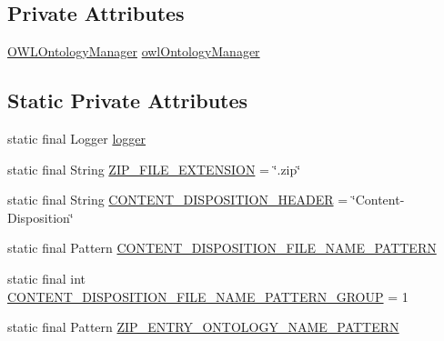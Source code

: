 \subsection*{Private Attributes}
\begin{DoxyCompactItemize}
\item 
\hyperlink{interfaceorg_1_1semanticweb_1_1owlapi_1_1model_1_1_o_w_l_ontology_manager}{O\-W\-L\-Ontology\-Manager} \hyperlink{classorg_1_1semanticweb_1_1owlapi_1_1io_1_1_abstract_o_w_l_parser_a6c362e88fff9fb36e661995812843370}{owl\-Ontology\-Manager}
\end{DoxyCompactItemize}
\subsection*{Static Private Attributes}
\begin{DoxyCompactItemize}
\item 
static final Logger \hyperlink{classorg_1_1semanticweb_1_1owlapi_1_1io_1_1_abstract_o_w_l_parser_a9385871827b98e599cec7cfc47d09955}{logger}
\item 
static final String \hyperlink{classorg_1_1semanticweb_1_1owlapi_1_1io_1_1_abstract_o_w_l_parser_a1ed6440b4d27465dd59b671e3d9f7f76}{Z\-I\-P\-\_\-\-F\-I\-L\-E\-\_\-\-E\-X\-T\-E\-N\-S\-I\-O\-N} = \char`\"{}.zip\char`\"{}
\item 
static final String \hyperlink{classorg_1_1semanticweb_1_1owlapi_1_1io_1_1_abstract_o_w_l_parser_a23d7055318a54ec7c25cf683e9457eb1}{C\-O\-N\-T\-E\-N\-T\-\_\-\-D\-I\-S\-P\-O\-S\-I\-T\-I\-O\-N\-\_\-\-H\-E\-A\-D\-E\-R} = \char`\"{}Content-\/Disposition\char`\"{}
\item 
static final Pattern \hyperlink{classorg_1_1semanticweb_1_1owlapi_1_1io_1_1_abstract_o_w_l_parser_a34933c2bce51119b1445a3ebee532b5f}{C\-O\-N\-T\-E\-N\-T\-\_\-\-D\-I\-S\-P\-O\-S\-I\-T\-I\-O\-N\-\_\-\-F\-I\-L\-E\-\_\-\-N\-A\-M\-E\-\_\-\-P\-A\-T\-T\-E\-R\-N}
\item 
static final int \hyperlink{classorg_1_1semanticweb_1_1owlapi_1_1io_1_1_abstract_o_w_l_parser_a213dfb4471ff95d2d8b3083e9c453ea2}{C\-O\-N\-T\-E\-N\-T\-\_\-\-D\-I\-S\-P\-O\-S\-I\-T\-I\-O\-N\-\_\-\-F\-I\-L\-E\-\_\-\-N\-A\-M\-E\-\_\-\-P\-A\-T\-T\-E\-R\-N\-\_\-\-G\-R\-O\-U\-P} = 1
\item 
static final Pattern \hyperlink{classorg_1_1semanticweb_1_1owlapi_1_1io_1_1_abstract_o_w_l_parser_ae307bbe8f7fd5b8e7d4c51284adf296b}{Z\-I\-P\-\_\-\-E\-N\-T\-R\-Y\-\_\-\-O\-N\-T\-O\-L\-O\-G\-Y\-\_\-\-N\-A\-M\-E\-\_\-\-P\-A\-T\-T\-E\-R\-N}
\end{DoxyCompactItemize}


